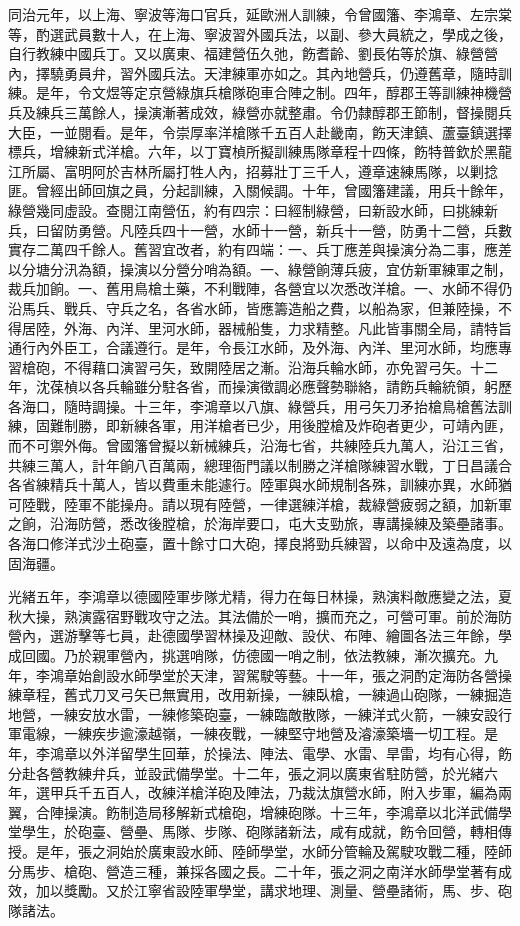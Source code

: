 \begin{pinyinscope}
同治元年，以上海、寧波等海口官兵，延歐洲人訓練，令曾國籓、李鴻章、左宗棠等，酌選武員數十人，在上海、寧波習外國兵法，以副、參大員統之，學成之後，自行教練中國兵丁。又以廣東、福建營伍久弛，飭耆齡、劉長佑等於旗、綠營營內，擇驍勇員弁，習外國兵法。天津練軍亦如之。其內地營兵，仍遵舊章，隨時訓練。是年，令文煜等定京營綠旗兵槍隊砲車合陣之制。四年，醇郡王等訓練神機營兵及練兵三萬餘人，操演漸著成效，綠營亦就整肅。令仍隸醇郡王節制，督操閱兵大臣，一並閱看。是年，令崇厚率洋槍隊千五百人赴畿南，飭天津鎮、蘆臺鎮選擇標兵，增練新式洋槍。六年，以丁寶楨所擬訓練馬隊章程十四條，飭特普欽於黑龍江所屬、富明阿於吉林所屬打牲人內，招募壯丁三千人，遵章速練馬隊，以剿捻匪。曾經出師回旗之員，分起訓練，入關候調。十年，曾國籓建議，用兵十餘年，綠營幾同虛設。查閱江南營伍，約有四宗：曰經制綠營，曰新設水師，曰挑練新兵，曰留防勇營。凡陸兵四十一營，水師十一營，新兵十一營，防勇十二營，兵數實存二萬四千餘人。舊習宜改者，約有四端：一、兵丁應差與操演分為二事，應差以分塘分汛為額，操演以分營分哨為額。一、綠營餉薄兵疲，宜仿新軍練軍之制，裁兵加餉。一、舊用鳥槍土藥，不利戰陣，各營宜以次悉改洋槍。一、水師不得仍沿馬兵、戰兵、守兵之名，各省水師，皆應籌造船之費，以船為家，但兼陸操，不得居陸，外海、內洋、里河水師，器械船隻，力求精整。凡此皆事關全局，請特旨通行內外臣工，合議遵行。是年，令長江水師，及外海、內洋、里河水師，均應專習槍砲，不得藉口演習弓矢，致開陸居之漸。沿海兵輪水師，亦免習弓矢。十二年，沈葆楨以各兵輪雖分駐各省，而操演徵調必應聲勢聯絡，請飭兵輪統領，躬歷各海口，隨時調操。十三年，李鴻章以八旗、綠營兵，用弓矢刀矛抬槍鳥槍舊法訓練，固難制勝，即新練各軍，用洋槍者已少，用後膛槍及炸砲者更少，可靖內匪，而不可禦外侮。曾國籓曾擬以新械練兵，沿海七省，共練陸兵九萬人，沿江三省，共練三萬人，計年餉八百萬兩，總理衙門議以制勝之洋槍隊練習水戰，丁日昌議合各省練精兵十萬人，皆以費重未能遽行。陸軍與水師規制各殊，訓練亦異，水師猶可陸戰，陸軍不能操舟。請以現有陸營，一律選練洋槍，裁綠營疲弱之額，加新軍之餉，沿海防營，悉改後膛槍，於海岸要口，屯大支勁旅，專講操練及築壘諸事。各海口修洋式沙土砲臺，置十餘寸口大砲，擇良將勁兵練習，以命中及遠為度，以固海疆。

光緒五年，李鴻章以德國陸軍步隊尤精，得力在每日林操，熟演料敵應變之法，夏秋大操，熟演露宿野戰攻守之法。其法備於一哨，擴而充之，可營可軍。前於海防營內，選游擊等七員，赴德國學習林操及迎敵、設伏、布陣、繪圖各法三年餘，學成回國。乃於親軍營內，挑選哨隊，仿德國一哨之制，依法教練，漸次擴充。九年，李鴻章始創設水師學堂於天津，習駕駛等藝。十一年，張之洞酌定海防各營操練章程，舊式刀叉弓矢已無實用，改用新操，一練臥槍，一練過山砲隊，一練掘造地營，一練安放水雷，一練修築砲臺，一練臨敵散隊，一練洋式火箭，一練安設行軍電線，一練疾步逾濠越嶺，一練夜戰，一練堅守地營及濬濠築墻一切工程。是年，李鴻章以外洋留學生回華，於操法、陣法、電學、水雷、旱雷，均有心得，飭分赴各營教練弁兵，並設武備學堂。十二年，張之洞以廣東省駐防營，於光緒六年，選甲兵千五百人，改練洋槍洋砲及陣法，乃裁汰旗營水師，附入步軍，編為兩翼，合陣操演。飭制造局移解新式槍砲，增練砲隊。十三年，李鴻章以北洋武備學堂學生，於砲臺、營壘、馬隊、步隊、砲隊諸新法，咸有成就，飭令回營，轉相傳授。是年，張之洞始於廣東設水師、陸師學堂，水師分管輪及駕駛攻戰二種，陸師分馬步、槍砲、營造三種，兼採各國之長。二十年，張之洞之南洋水師學堂著有成效，加以獎勵。又於江寧省設陸軍學堂，講求地理、測量、營壘諸術，馬、步、砲隊諸法。


\end{pinyinscope}

